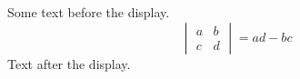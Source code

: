 \documentclass[12pt]{article}
\begin{document}
Some text before the display.
\[ \begin{vmatrix} a & b \\ c & d \end{vmatrix} = ad - bc \]
Text after the display.
\end{document}
